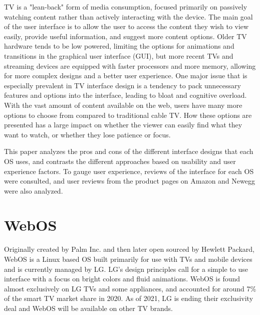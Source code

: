 \documentclass[12pt, letterpaper]{article}
\begin{document}
TV is a "lean-back" form of media consumption, focused primarily on passively watching content rather than actively interacting with the device.  The main 
goal of the user interface is to allow the user to access the content they wish to view easily, provide useful information, and suggest more content options\cite{7774793}.  Older TV hardware tends to be low powered, limiting the options for animations 
and transitions in the graphical user interface (GUI), but more recent TVs and streaming devices are equipped with faster processors and more memory, allowing for more complex designs and a better user experience.  
One major issue that is especially prevalent in TV interface design is a tendency to pack unnecessary features and options into the interface, leading to bloat and cognitive overload.  With the vast amount of content available on the web,
users have many more options to choose from compared to traditional cable TV.  How these options are presented has a large impact on whether the viewer can easily find what they want to watch, or whether they lose patience or focus.  

This paper analyzes the pros and cons of the different interface designs that each OS uses, and contrasts the different approaches based on usability and user experience factors.  To gauge user experience, reviews of the interface for each OS were consulted, and 
user reviews from the product pages on Amazon and Newegg were also analyzed.  

\section{WebOS}
Originally created by Palm Inc. and then later open sourced by Hewlett Packard, WebOS is a Linux based OS built primarily for use with TVs and mobile devices and is currently managed by LG\cite{enwiki:1012760174}.
LG's design principles call for a simple to use interface with a focus on bright colors and fluid animations. WebOS is found almost exclusively on LG TVs and some appliances, and accounted for around 7\% of the smart TV market share in 2020\cite{strategy_analytics_2020}.  As of 2021, LG is ending
their exclusivity deal and WebOS will be available on other TV brands.  
\end{document}
